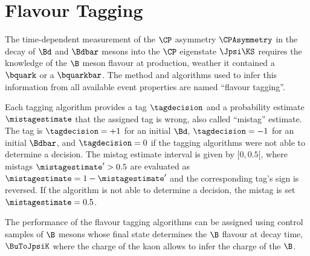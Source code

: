
\chapter{Flavour Tagging}
\label{ch:flavour_tagging}

The time-dependent measurement of the $\CP$ asymmetry $\CPAsymmetry$ in the
decay of $\Bd$ and $\Bdbar$ mesons into the $\CP$ eigenstate $\Jpsi\KS$ requires
the knowledge of the $\B$ meson flavour at production, \ie weather it contained
a $\bquark$ or a $\bquarkbar$. The method and algorithms used to infer this
information from all available event properties are named \enquote{flavour
tagging}.

Each tagging algorithm provides a tag $\tagdecision$ and a probability estimate
$\mistagestimate$ that the assigned tag is wrong, also called \enquote{mistag}
estimate. The tag is $\tagdecision=+1$ for an initial $\Bd$, $\tagdecision=-1$
for an initial $\Bdbar$, and $\tagdecision=0$ if the tagging algorithms were not
able to determine a decision. The mistag estimate interval is given by
$[0,0.5[$, where mistags $\mistagestimate^{\prime}>0.5$ are evaluated as
$\mistagestimate = 1 - \mistagestimate^{\prime}$ and the corresponding tag's
sign is reversed. If the algorithm is not able to determine a decision, the
mistag is set $\mistagestimate=0.5$.

The performance of the flavour tagging algorithms can be assigned using control
samples of $\B$ mesons whose final state determines the $\B$ flavour at decay
time, \eg $\BuToJpsiK$ where the charge of the kaon allows to infer the charge
of the $\B$.

